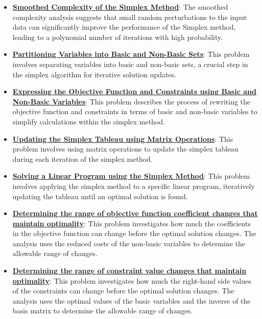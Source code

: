\documentclass{article}%
\begin{document}
\begin{itemize}[leftmargin=*]
\item \href{https://www.math.purdue.edu/~yipn/421/2024-09-05-SimplexEfficiency.pdf#page=11}{\textbf{Smoothed Complexity of the Simplex Method}}: The smoothed complexity analysis suggests that small random perturbations to the input data can significantly improve the performance of the Simplex method, leading to a polynomial number of iterations with high probability.%
\item \href{https://www.math.purdue.edu/~yipn/421/2024-09-24-SimplexMatrix.pdf#page=4}{\textbf{Partitioning Variables into Basic and Non-Basic Sets}}: This problem involves separating variables into basic and non-basic sets, a crucial step in the simplex algorithm for iterative solution updates.%
\item \href{https://www.math.purdue.edu/~yipn/421/2024-09-24-SimplexMatrix.pdf#page=8}{\textbf{Expressing the Objective Function and Constraints using Basic and Non-Basic Variables}}: This problem describes the process of rewriting the objective function and constraints in terms of basic and non-basic variables to simplify calculations within the simplex method.%
\item \href{https://www.math.purdue.edu/~yipn/421/2024-09-24-SimplexMatrix.pdf#page=10}{\textbf{Updating the Simplex Tableau using Matrix Operations}}: This problem involves using matrix operations to update the simplex tableau during each iteration of the simplex method.%
\item \href{https://www.math.purdue.edu/~yipn/421/2024-09-24-SimplexMatrix.pdf#page=15}{\textbf{Solving a Linear Program using the Simplex Method}}: This problem involves applying the simplex method to a specific linear program, iteratively updating the tableau until an optimal solution is found.%
\item \href{https://www.math.purdue.edu/~yipn/421/2024-09-26-Sensitivity.pdf#page=4}{\textbf{Determining the range of objective function coefficient changes that maintain optimality}}: This problem investigates how much the coefficients in the objective function can change before the optimal solution changes. The analysis uses the reduced costs of the non-basic variables to determine the allowable range of changes.%
\item \href{https://www.math.purdue.edu/~yipn/421/2024-09-26-Sensitivity.pdf#page=8}{\textbf{Determining the range of constraint value changes that maintain optimality}}: This problem investigates how much the right-hand side values of the constraints can change before the optimal solution changes. The analysis uses the optimal values of the basic variables and the inverse of the basis matrix to determine the allowable range of changes.%

\end{itemize}
\end{document}
